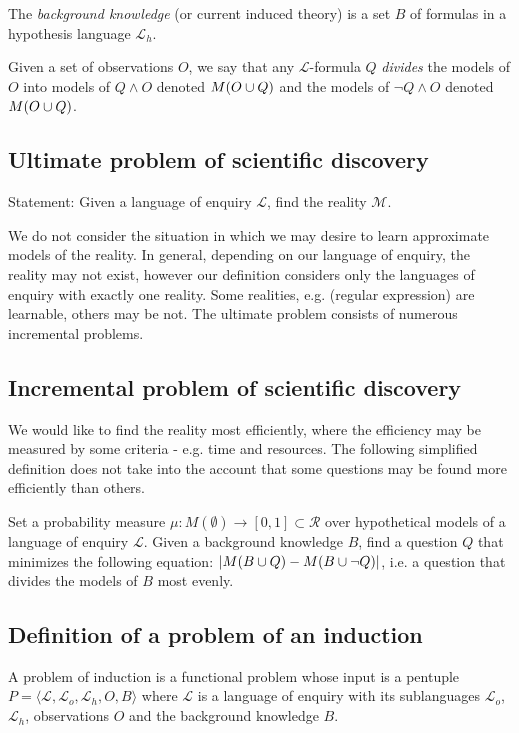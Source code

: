 \begin{defn}
The \emph{background knowledge} (or current induced theory) is a set $B$ of formulas in a hypothesis language $\mathcal{L}_h$.
\end{defn}

\begin{defn}
Given a set of observations $O$, we say that any $\mathcal{L}$-formula $Q$ \emph{divides} the models of $O$ into models of $Q \wedge O$ denoted $M(O \cup {Q})$ and the models of $\neg Q \wedge O$ denoted $M(O \cup {Q})$.
\end{defn}

\subsection{Ultimate problem of scientific discovery}
Statement: Given a language of enquiry $\mathcal{L}$, find the reality $\mathcal{M}$.

We do not consider the situation in which we may desire to learn approximate models of the reality. In general, depending on our language of enquiry, the reality may not exist, however our definition considers only the languages of enquiry with exactly one reality. Some realities, e.g. (regular expression) are learnable, others may be not. The ultimate problem consists of numerous incremental problems.

\subsection{Incremental problem of scientific discovery}
We would like to find the reality most efficiently, where the efficiency may be measured by some criteria - e.g. time and resources. The following simplified definition does not take into the account that some questions may be found more efficiently than others.

Set a probability measure $\mu:M(\emptyset) \to [0,1] \subset \mathcal{R}$ over hypothetical models of a language of enquiry $\mathcal{L}$. Given a background knowledge $B$, find a question $Q$ that minimizes the following equation: $|M(B \cup {Q})-M(B \cup {\neg Q})|$, i.e. a question that divides the models of $B$ most evenly.

\subsection{Definition of a problem of an induction}
A problem of induction is a functional problem whose input is a pentuple $P=\langle\mathcal{L}, \mathcal{L}_o, \mathcal{L}_h, O, B\rangle$ where $\mathcal{L}$ is a language of enquiry with its sublanguages $\mathcal{L}_o$, $\mathcal{L}_h$, observations $O$ and the background knowledge $B$.

